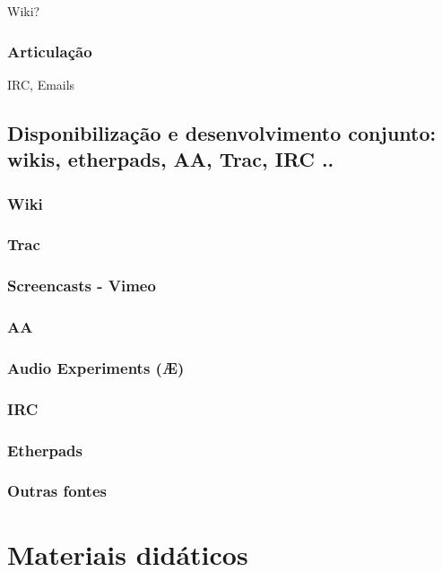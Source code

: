       Wiki?

      \subsubsection{Articulação}

      IRC, Emails

\subsection{Disponibilização e desenvolvimento conjunto: wikis, etherpads, AA, Trac, IRC ..}

\subsubsection{Wiki}

\subsubsection{Trac}

\subsubsection{Screencasts - Vimeo}

\subsubsection{AA}

\subsubsection{Audio Experiments (Æ)}

\subsubsection{IRC}

\subsubsection{Etherpads}

\subsubsection{Outras fontes}

\section{Materiais didáticos}

